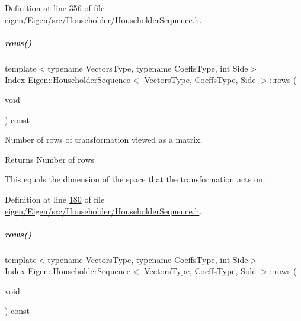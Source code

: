 Definition at line \hyperlink{eigen_2_eigen_2src_2_householder_2_householder_sequence_8h_source_l00356}{356} of file \hyperlink{eigen_2_eigen_2src_2_householder_2_householder_sequence_8h_source}{eigen/\+Eigen/src/\+Householder/\+Householder\+Sequence.\+h}.

\mbox{\label{group___householder___module_a6eaafe2460930d1f4aa67d6e577b71f0}} 
\subparagraph{\texorpdfstring{rows()}{rows()}\hspace{0.1cm}{\footnotesize\ttfamily [1/2]}}
{\footnotesize\ttfamily template$<$typename Vectors\+Type, typename Coeffs\+Type, int Side$>$ \\
\hyperlink{group___core___module_a554f30542cc2316add4b1ea0a492ff02}{Index} \hyperlink{group___householder___module_class_eigen_1_1_householder_sequence}{Eigen\+::\+Householder\+Sequence}$<$ Vectors\+Type, Coeffs\+Type, Side $>$\+::rows (\begin{DoxyParamCaption}\item[{void}]{ }\end{DoxyParamCaption}) const\hspace{0.3cm}{\ttfamily [inline]}}



Number of rows of transformation viewed as a matrix. 

\begin{DoxyReturn}{Returns}
Number of rows
\end{DoxyReturn}
This equals the dimension of the space that the transformation acts on. 

Definition at line \hyperlink{eigen_2_eigen_2src_2_householder_2_householder_sequence_8h_source_l00180}{180} of file \hyperlink{eigen_2_eigen_2src_2_householder_2_householder_sequence_8h_source}{eigen/\+Eigen/src/\+Householder/\+Householder\+Sequence.\+h}.

\mbox{\label{group___householder___module_a6eaafe2460930d1f4aa67d6e577b71f0}} 
\subparagraph{\texorpdfstring{rows()}{rows()}\hspace{0.1cm}{\footnotesize\ttfamily [2/2]}}
{\footnotesize\ttfamily template$<$typename Vectors\+Type, typename Coeffs\+Type, int Side$>$ \\
\hyperlink{group___core___module_a554f30542cc2316add4b1ea0a492ff02}{Index} \hyperlink{group___householder___module_class_eigen_1_1_householder_sequence}{Eigen\+::\+Householder\+Sequence}$<$ Vectors\+Type, Coeffs\+Type, Side $>$\+::rows (\begin{DoxyParamCaption}\item[{void}]{ }\end{DoxyParamCaption}) const\hspace{0.3cm}{\ttfamily [inline]}}



